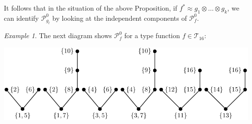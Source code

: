 \documentclass[12pt]{article}
\theoremstyle{definition}
\theoremstyle{remark}
\newtheorem{exm}{Example}
\def\Te{\mathcal T}
\def\Pe{\mathcal P}
\begin{document}
It follows that in the situation of the above Proposition, if $f^*\approx g_1\otimes
\dots\otimes g_k$, we can identify $\Pe_{g_l}^0$  by looking at the independent
components of $\Pe_f^0$.
\begin{exm}\label{exm:components} The next diagram shows $\Pe_f^0$ for a type function
$f\in \Te_{16}$:

\begin{center}
\includegraphics[scale=0.8]{components.pdf}
\end{center}


\end{exm}
\end{document}
